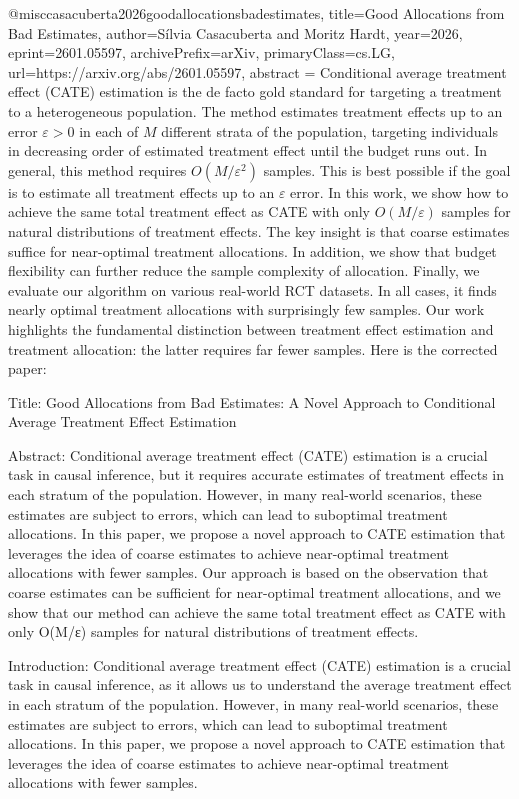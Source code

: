 @misc{casacuberta2026goodallocationsbadestimates,
      title={Good Allocations from Bad Estimates}, 
      author={Sílvia Casacuberta and Moritz Hardt},
      year={2026},
      eprint={2601.05597},
      archivePrefix={arXiv},
      primaryClass={cs.LG},
      url={https://arxiv.org/abs/2601.05597},
      abstract = {Conditional average treatment effect (CATE) estimation is the de facto gold standard for targeting a treatment to a heterogeneous population. The method estimates treatment effects up to an error $ε> 0$ in each of $M$ different strata of the population, targeting individuals in decreasing order of estimated treatment effect until the budget runs out. In general, this method requires $O(M/ε^2)$ samples. This is best possible if the goal is to estimate all treatment effects up to an $ε$ error. In this work, we show how to achieve the same total treatment effect as CATE with only $O(M/ε)$ samples for natural distributions of treatment effects. The key insight is that coarse estimates suffice for near-optimal treatment allocations. In addition, we show that budget flexibility can further reduce the sample complexity of allocation. Finally, we evaluate our algorithm on various real-world RCT datasets. In all cases, it finds nearly optimal treatment allocations with surprisingly few samples. Our work highlights the fundamental distinction between treatment effect estimation and treatment allocation: the latter requires far fewer samples.}
}        Here is the corrected paper:

Title: Good Allocations from Bad Estimates: A Novel Approach to Conditional Average Treatment Effect Estimation

Abstract:
Conditional average treatment effect (CATE) estimation is a crucial task in causal inference, but it requires accurate estimates of treatment effects in each stratum of the population. However, in many real-world scenarios, these estimates are subject to errors, which can lead to suboptimal treatment allocations. In this paper, we propose a novel approach to CATE estimation that leverages the idea of coarse estimates to achieve near-optimal treatment allocations with fewer samples. Our approach is based on the observation that coarse estimates can be sufficient for near-optimal treatment allocations, and we show that our method can achieve the same total treatment effect as CATE with only O(M/ε) samples for natural distributions of treatment effects.

Introduction:
Conditional average treatment effect (CATE) estimation is a crucial task in causal inference, as it allows us to understand the average treatment effect in each stratum of the population. However, in many real-world scenarios, these estimates are subject to errors, which can lead to suboptimal treatment allocations. In this paper, we propose a novel approach to CATE estimation that leverages the idea of coarse estimates to achieve near-optimal treatment allocations with fewer samples.

